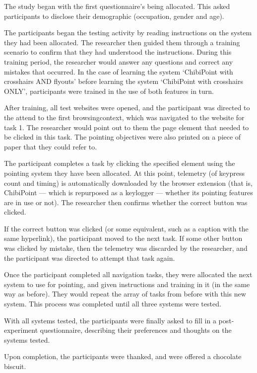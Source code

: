 \documentclass[a4paper, 12pt]{report}
\begin{document}
The study began with the first questionnaire's being allocated. This asked participants to disclose their demographic (occupation, gender and age).

The participants began the testing activity by reading instructions on the system they had been allocated. The researcher then guided them through a training scenario to confirm that they had understood the instructions. During this training period, the researcher would answer any questions and correct any mistakes that occurred. In the case of learning the system `ChibiPoint with crosshairs AND flyouts' before learning the system `ChibiPoint with crosshairs ONLY', participants were trained in the use of both features in turn.

After training, all test websites were opened, and the participant was directed to the attend to the first \gls{browsingcontext}, which was navigated to the website for task 1. The researcher would point out to them the page element that needed to be clicked in this task. The pointing objectives were also printed on a piece of paper that they could refer to.

The participant completes a task by clicking the specified element using the pointing system they have been allocated. At this point, telemetry (of keypress count and timing) is automatically downloaded by the browser extension (that is, ChibiPoint --- which is repurposed as a keylogger --- whether its pointing features are in use or not). The researcher then confirms whether the correct button was clicked.

If the correct button was clicked (or some equivalent, such as a caption with the same hyperlink), the participant moved to the next task. If some other button was clicked by mistake, then the telemetry was discarded by the researcher, and the participant was directed to attempt that task again.

Once the participant completed all navigation tasks, they were allocated the next system to use for pointing, and given instructions and training in it (in the same way as before). They would repeat the array of tasks from before with this new system. This process was completed until all three systems were tested.

With all systems tested, the participants were finally asked to fill in a post-experiment questionnaire, describing their preferences and thoughts on the systems tested.

Upon completion, the participants were thanked, and were offered a chocolate biscuit.
\end{document}
